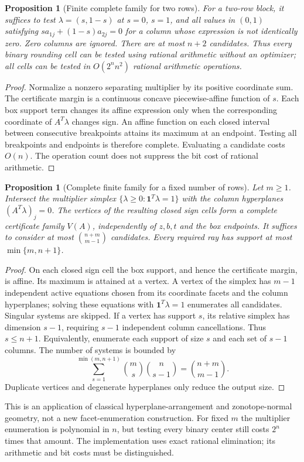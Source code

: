 \documentclass[11pt]{article}
\newtheorem{proposition}[theorem]{Proposition}
\begin{document}
\begin{proposition}[Finite complete family for two rows]
For a two-row block, it suffices to test $\lambda=(s,1-s)$ at $s=0$, $s=1$, and
all values in $(0,1)$ satisfying
$s a_{1j}+(1-s)a_{2j}=0$ for a column whose expression is not identically zero.
Zero columns are ignored. There are at most $n+2$ candidates.
Thus every binary rounding cell can be tested using rational arithmetic without
an optimizer; all cells can be tested in $O(2^n n^2)$ rational arithmetic operations.
\end{proposition}
\begin{proof}
Normalize a nonzero separating multiplier by its positive coordinate sum. The
certificate margin is a continuous concave piecewise-affine function of $s$.
Each box support term changes its affine expression only when the corresponding
coordinate of $A^T\lambda$ changes sign. An affine function on each closed interval
between consecutive breakpoints attains its maximum at an endpoint. Testing all
breakpoints and endpoints is therefore complete. Evaluating a candidate costs $O(n)$.
The operation count does not suppress the bit cost of rational arithmetic.
\end{proof}

\begin{proposition}[Complete finite family for a fixed number of rows]
Let $m\ge1$. Intersect the multiplier simplex $\{\lambda\ge0:
\boldsymbol1^T\lambda=1\}$ with the column hyperplanes
$(A^T\lambda)_j=0$. The vertices of the resulting closed sign cells form a complete
certificate family $V(A)$, independently of $z,b,t$ and the box endpoints.
It suffices to consider at most $\binom{n+m}{m-1}$ candidates. Every required
ray has support at most $\min\{m,n+1\}$.
\end{proposition}
\begin{proof}
On each closed sign cell the box support, and hence the certificate margin,
is affine. Its maximum is attained at a vertex. A vertex of the simplex has
$m-1$ independent active equations chosen from its coordinate facets and the
column hyperplanes; solving these equations with $\boldsymbol1^T\lambda=1$
enumerates all candidates. Singular systems are skipped. If a vertex has support
$s$, its relative simplex has dimension $s-1$, requiring $s-1$ independent
column cancellations. Thus $s\le n+1$. Equivalently, enumerate each support of
size $s$ and each set of $s-1$ columns. The number of systems is bounded by
\[
 \sum_{s=1}^{\min(m,n+1)}\binom ms\binom n{s-1}
 =\binom{n+m}{m-1}.
\]
Duplicate vertices and degenerate hyperplanes only reduce the output size.
\end{proof}
This is an application of classical hyperplane-arrangement and zonotope-normal
geometry, not a new facet-enumeration construction. For fixed $m$ the multiplier
enumeration is polynomial in $n$, but testing every binary center still costs
$2^n$ times that amount. The implementation uses exact rational elimination;
its arithmetic and bit costs must be distinguished.
\end{document}
